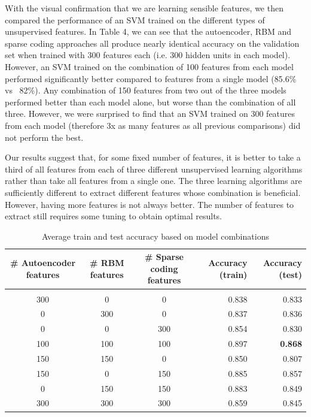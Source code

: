 \documentclass{article} %
\begin{document}
With the visual confirmation that we are learning sensible features, we then compared the performance of an SVM trained on the different types of unsupervised features. In Table 4, we can see that the autoencoder, RBM and sparse coding approaches all produce nearly identical accuracy on the validation set when trained with 300 features each (i.e. 300 hidden units in each model). However, an SVM trained on the combination of 100 features from each model performed significantly better compared to features from a single model (85.6\% vs ~82\%). Any combination of 150 features from two out of the three models performed better than each model alone, but worse than the combination of all three. However, we were surprised to find that an SVM trained on 300 features from each model (therefore 3x as many features as all previous comparisons) did not perform the best. 

Our results suggest that, for some fixed number of features, it is better to take a third of all features from each of three different unsupervised learning algorithms rather than take all features from a single one. The three learning algorithms are sufficiently different to extract different features whose combination is beneficial. However, having more features is not always better. The number of features to extract still requires some tuning to obtain optimal results.




\begin{table}[h]
\caption{Average train and test accuracy based on model combinations}
\label{results-table}
\begin{center}
\begin{adjustbox}{width=1\textwidth}
\begin{tabular}{ccc|rr}

\multicolumn{1}{c}{\bf \# Autoencoder features}  
&\multicolumn{1}{c}{\bf \# RBM features}  
&\multicolumn{1}{c}{\bf \# Sparse coding features} 
&\multicolumn{1}{|r}{\bf Accuracy (train)}
&\multicolumn{1}{r}{\bf Accuracy (test)}
\\ \hline \\	
300 & 0 & 0 & 0.838 & 0.833 \\
0 & 300 & 0 & 0.837 & 0.836 \\
0 & 0 & 300 & 0.854 & 0.830  \\
100 & 100 & 100 & 0.897 & \textbf{0.868} \\
150 & 150 & 0 & 0.850 & 0.807 \\
150 & 0 & 150 & 0.885 & 0.857 \\
0 & 150 & 150 & 0.883& 0.849 \\
300 & 300 & 300 & 0.859 & 0.845 \\

\end{tabular}
\end{adjustbox}
\end{center}
\end{table}
\end{document}
